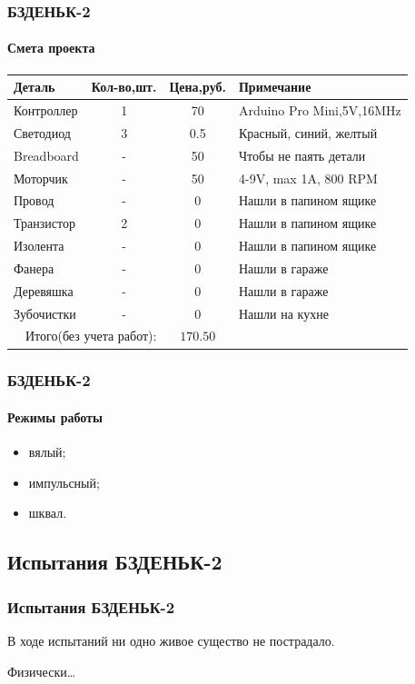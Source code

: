 \begin{frame}
    \frametitle{БЗДЕНЬК-2}
    \framesubtitle{Смета проекта}
    
    \begin{center}
        \begin{tabular}{l|c|c|l}
            \hline\hline
            Деталь & Кол-во,шт. & Цена,руб. & Примечание \\
            \hline\hline
            Контроллер & 1 & 70  & Arduino Pro Mini,5V,16MHz\\
            Светодиод  & 3 & 0.5 & Красный, синий, желтый\\
            Breadboard & - & 50  & Чтобы не паять детали\\
            Моторчик   & - & 50  & 4-9V, max 1A, 800 RPM\\
            Провод     & - & 0   & Нашли в папином ящике\\
            Транзистор & 2 & 0   & Нашли в папином ящике\\
            Изолента   & - & 0   & Нашли в папином ящике\\
            Фанера     & - & 0   & Нашли в гараже\\
            Деревяшка  & - & 0   & Нашли в гараже\\
            Зубочистки & - & 0   & Нашли на кухне\\ \hline
            \multicolumn{2}{r|}{Итого(\alert{без учета работ}):} & \multicolumn{1}{c}{\alert{$170.50$}} & \\
        \end{tabular}
    \end{center}
\end{frame}

\begin{frame}
    \frametitle{БЗДЕНЬК-2}
    \framesubtitle{Режимы работы}
    
    \begin{itemize}
        \item вялый;
        \item импульсный;
        \item шквал.
    \end{itemize}    
\end{frame}


\subsection{Испытания БЗДЕНЬК-2}

\begin{frame}
    \frametitle{Испытания БЗДЕНЬК-2}
    \begin{center}
        В ходе испытаний ни одно живое существо не пострадало.

        Физически\ldots    
    \end{center}    
\end{frame}

